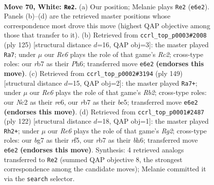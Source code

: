 \documentclass[11pt]{article}
\begin{document}
\clearpage

\begin{figure}[p]\centering
\begin{subfigure}{0.46\textwidth}\centering
\resizebox{\linewidth}{!}{%
\newchessgame
\chessboard[
  setfen={7k/1r4b1/4R3/R7/2P5/8/2N3K1/8 w - - 60 70},
  showmover=false,
  pgfstyle=straightmove, color=movearrow, markmove={e6-e2}
]}
\caption{}
\end{subfigure}\hfill
\begin{subfigure}{0.46\textwidth}\centering
\resizebox{\linewidth}{!}{%
\newchessgame
\chessboard[
  setfen={8/2r5/5k1p/8/4B2P/5K2/8/8 b - - 3 63},
  showmover=false,
  pgfstyle=straightmove, color=movearrow, markmove={c7-a7}
]}
\caption{}
\end{subfigure}
\\[4pt]
\begin{subfigure}{0.46\textwidth}\centering
\resizebox{\linewidth}{!}{%
\newchessgame
\chessboard[
  setfen={8/1r6/4R3/4Bp2/8/K2k4/P7/8 b - - 0 75},
  showmover=false,
  pgfstyle=straightmove, color=movearrow, markmove={b7-a7}
]}
\caption{}
\end{subfigure}\hfill
\begin{subfigure}{0.46\textwidth}\centering
\resizebox{\linewidth}{!}{%
\newchessgame
\chessboard[
  setfen={8/8/7b/5r1k/8/8/6R1/K7 w - - 14 62},
  showmover=false,
  pgfstyle=straightmove, color=movearrow, markmove={g2-h2}
]}
\caption{}
\end{subfigure}
\caption{\textbf{Move 70, White: \texttt{Re2}.} (a) Our position; Melanie plays \texttt{Re2} (\texttt{e6e2}). Panels (b)--(d) are the retrieved master positions whose correspondence most drove this move (highest QAP objective among those that transfer to it). (b) Retrieved from \texttt{ccrl\_top\_p0003\#2008} (ply 125) [structural distance $d$=16, QAP obj=3]: the master played \texttt{Ra7}; under $\mu$ our \emph{Re6} plays the role of that game's \emph{Rc2}; cross-type roles: our \emph{r}b7 as their \emph{P}h6; transferred move \texttt{e6e2} \textbf{(endorses this move)}. (c) Retrieved from \texttt{ccrl\_top\_p0002\#3194} (ply 149) [structural distance $d$=15, QAP obj=2]: the master played \texttt{Ra7+}; under $\mu$ our \emph{Re6} plays the role of that game's \emph{Rb2}; cross-type roles: our \emph{N}c2 as their \emph{r}e6, our \emph{r}b7 as their \emph{b}e5; transferred move \texttt{e6e2} \textbf{(endorses this move)}. (d) Retrieved from \texttt{ccrl\_top\_p0001\#2487} (ply 122) [structural distance $d$=18, QAP obj=1]: the master played \texttt{Rh2+}; under $\mu$ our \emph{Re6} plays the role of that game's \emph{Rg2}; cross-type roles: our \emph{b}g7 as their \emph{r}f5, our \emph{r}b7 as their \emph{b}h6; transferred move \texttt{e6e2} \textbf{(endorses this move)}. Synthesis: 4 retrieved analogs transferred to \texttt{Re2} (summed QAP objective 8, the strongest correspondence among the candidate moves); Melanie committed it via the \texttt{search} selector.}
\label{fig:thought-m138}
\end{figure}
\end{document}
